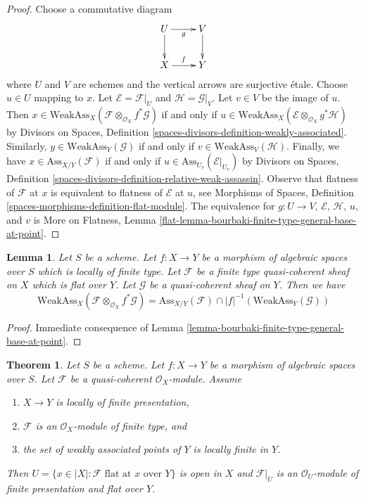 \documentclass{stacks-project}
\theoremstyle{plain}
\newtheorem{theorem}[subsection]{Theorem}
\newtheorem{lemma}[subsection]{Lemma}
\theoremstyle{definition}
\theoremstyle{remark}
\numberwithin{equation}{subsection}
\begin{document}
\begin{proof}
Choose a commutative diagram
$$
\xymatrix{
U \ar[d] \ar[r]_g & V \ar[d] \\
X \ar[r]^f & Y
}
$$
where $U$ and $V$ are schemes and the vertical arrows are surjective \'etale.
Choose $u \in U$ mapping to $x$. Let $\mathcal{E} = \mathcal{F}|_U$
and $\mathcal{H} = \mathcal{G}|_V$.
Let $v \in V$ be the image of $u$. Then
$x \in \text{WeakAss}_X(\mathcal{F} \otimes_{\mathcal{O}_X} f^*\mathcal{G})$
if and only if
$u \in \text{WeakAss}_X(\mathcal{E} \otimes_{\mathcal{O}_X} g^*\mathcal{H})$
by Divisors on Spaces, Definition
\ref{spaces-divisors-definition-weakly-associated}.
Similarly, $y \in \text{WeakAss}_Y(\mathcal{G})$ if and only if
$v \in \text{WeakAss}_V(\mathcal{H})$.
Finally, we have $x \in \text{Ass}_{X/Y}(\mathcal{F})$ if and only if
$u \in \text{Ass}_{U_v}(\mathcal{E}|_{U_v})$ by
Divisors on Spaces, Definition
\ref{spaces-divisors-definition-relative-weak-assassin}.
Observe that flatness of $\mathcal{F}$ at $x$ is
equivalent to flatness of $\mathcal{E}$ at $u$, see
Morphisms of Spaces, Definition \ref{spaces-morphisms-definition-flat-module}.
The equivalence for $g : U \to V$, $\mathcal{E}$, $\mathcal{H}$, $u$, and $v$
is More on Flatness, Lemma
\ref{flat-lemma-bourbaki-finite-type-general-base-at-point}.
\end{proof}

\begin{lemma}
\label{lemma-bourbaki-finite-type-general-base}
Let $S$ be a scheme. Let $f : X \to Y$ be a morphism of algebraic spaces
over $S$ which is locally of finite type.
Let $\mathcal{F}$ be a finite type quasi-coherent sheaf on $X$
which is flat over $Y$. Let $\mathcal{G}$ be a quasi-coherent sheaf on $Y$.
Then we have
$$
\text{WeakAss}_X(\mathcal{F} \otimes_{\mathcal{O}_X} f^*\mathcal{G}) =
\text{Ass}_{X/Y}(\mathcal{F}) \cap
|f|^{-1}(\text{WeakAss}_Y(\mathcal{G}))
$$
\end{lemma}

\begin{proof}
Immediate consequence of
Lemma \ref{lemma-bourbaki-finite-type-general-base-at-point}.
\end{proof}

\begin{theorem}
\label{theorem-finite-type-flat}
Let $S$ be a scheme.
Let $f : X \to Y$ be a morphism of algebraic spaces over $S$.
Let $\mathcal{F}$ be a quasi-coherent $\mathcal{O}_X$-module.
Assume
\begin{enumerate}
\item $X \to Y$ is locally of finite presentation,
\item $\mathcal{F}$ is an $\mathcal{O}_X$-module of finite type, and
\item the set of weakly associated points of $Y$ is locally finite in $Y$.
\end{enumerate}
Then $U = \{x \in |X| : \mathcal{F}\text{ flat at }x\text{ over }Y\}$
is open in $X$ and $\mathcal{F}|_U$ is an $\mathcal{O}_U$-module
of finite presentation and flat over $Y$.
\end{theorem}
\end{document}
